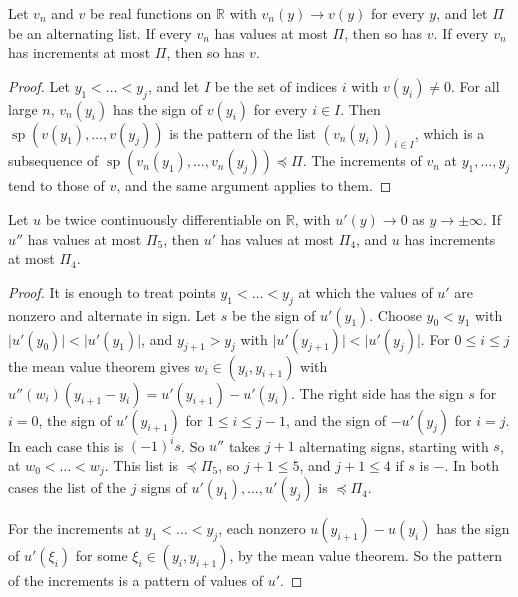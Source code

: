 \begin{lemma}\label{lem:sp-limit}
Let $v_n$ and $v$ be real functions on $\mathbb R$ with $v_n(y)\to v(y)$ for
every $y$, and let $\Pi$ be an alternating list. If every $v_n$ has values at
most $\Pi$, then so has $v$. If every $v_n$ has increments at most $\Pi$, then
so has $v$.
\end{lemma}

\begin{proof}
Let $y_1<\dots<y_j$, and let $I$ be the set of indices $i$ with $v(y_i)\ne0$.
For all large $n$, $v_n(y_i)$ has the sign of $v(y_i)$ for every $i\in I$.
Then $\operatorname{sp}(v(y_1),\dots,v(y_j))$ is the pattern of the list
$(v_n(y_i))_{i\in I}$, which is a subsequence of
$\operatorname{sp}(v_n(y_1),\dots,v_n(y_j))\preceq\Pi$. The increments of $v_n$
at $y_1,\dots,y_j$ tend to those of $v$, and the same argument applies to
them.
\end{proof}

\begin{lemma}\label{lem:sp-derivative}
Let $u$ be twice continuously differentiable on $\mathbb R$, with $u'(y)\to0$
as $y\to\pm\infty$. If $u''$ has values at most $\Pi_5$, then $u'$ has values
at most $\Pi_4$, and $u$ has increments at most $\Pi_4$.
\end{lemma}

\begin{proof}
It is enough to treat points $y_1<\dots<y_j$ at which the values of $u'$ are
nonzero and alternate in sign. Let $s$ be the sign of $u'(y_1)$. Choose $y_0<y_1$
with $\lvert u'(y_0)\rvert<\lvert u'(y_1)\rvert$, and $y_{j+1}>y_j$ with
$\lvert u'(y_{j+1})\rvert<\lvert u'(y_j)\rvert$. For $0\le i\le j$ the mean
value theorem gives $w_i\in(y_i,y_{i+1})$ with
$u''(w_i)(y_{i+1}-y_i)=u'(y_{i+1})-u'(y_i)$. The right side has the sign $s$
for $i=0$, the sign of $u'(y_{i+1})$ for $1\le i\le j-1$, and the sign of
$-u'(y_j)$ for $i=j$. In each case this is $(-1)^is$. So $u''$ takes $j+1$
alternating signs, starting with $s$, at $w_0<\dots<w_j$. This list is
$\preceq\Pi_5$, so $j+1\le5$, and $j+1\le4$ if $s$ is $-$. In both cases the
list of the $j$ signs of $u'(y_1),\dots,u'(y_j)$ is $\preceq\Pi_4$.

For the increments at $y_1<\dots<y_j$, each nonzero $u(y_{i+1})-u(y_i)$ has
the sign of $u'(\xi_i)$ for some $\xi_i\in(y_i,y_{i+1})$, by the mean value
theorem. So the pattern of the increments is a pattern of values of $u'$.
\end{proof}


